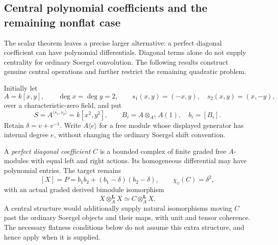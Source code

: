 \documentclass[11pt,a4paper]{article}
\theoremstyle{named}\newtheorem{finding}{Finding}[section]
\theoremstyle{definition}\newtheorem{definition}[finding]{Definition}
\theoremstyle{remark}\newtheorem{remark}[finding]{Remark}
\begin{document}
\subsection{Central polynomial coefficients and the remaining nonflat case}

The scalar theorem leaves a precise larger alternative:
a perfect diagonal coefficient can have polynomial
differentials. Diagonal terms alone do not supply
centrality for ordinary Soergel convolution. The
following results construct genuine central operations
and further restrict the remaining quadratic problem.

Initially let
\[
 A=k[x,y],\qquad \deg x=\deg y=2,\qquad
 s_1(x,y)=(-x,y),\quad s_2(x,y)=(x,-y),
\]
over a characteristic-zero field, and put
\[
 S=A^{\langle s_1,s_2\rangle}=k[x^2,y^2],\qquad
 B_i=A\otimes_{A^{s_i}}A(1),\quad b_i=[B_i].
\]
Retain \(\delta=v+v^{-1}\).
Write \(A\langle e\rangle\) for a free module whose
displayed generator has internal degree \(e\), without
changing the ordinary Soergel shift convention.

A \emph{perfect diagonal coefficient} \(C\) is a
bounded complex of finite graded free \(A\)-modules
with equal left and right actions. Its homogeneous
differential may have polynomial entries.
The target remains
\begin{equation}\label{eq:centralCoefficientTarget}
 [X]=P=b_1b_2+(b_1-\delta)(b_2-\delta),\qquad
 \chi_v(C)=\delta^2,
\end{equation}
with an actual graded derived bimodule isomorphism
\begin{equation}\label{eq:centralCoefficientQuadratic}
 X\otimes_A^{\mathbf L}X
       \simeq C\otimes_A^{\mathbf L}X.
\end{equation}
A central structure would additionally supply natural
isomorphisms moving \(C\) past the ordinary Soergel
objects and their maps, with unit and tensor coherence.
The necessary flatness conditions below do not assume
this extra structure, and hence apply when it is supplied.
\end{document}
